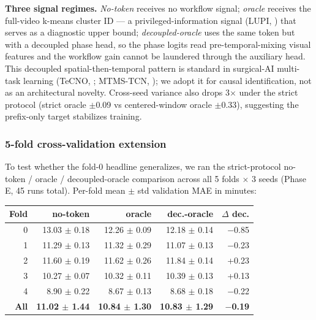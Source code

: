 \textbf{Three signal regimes.} \emph{No-token} receives no workflow
signal; \emph{oracle} receives the full-video k-means cluster ID — a
privileged-information signal (LUPI, \citealt{vapnik2009lupi}) that
serves as a diagnostic upper bound; \emph{decoupled-oracle} uses the
same token but with a decoupled phase head, so the phase logits read
pre-temporal-mixing visual features and the workflow gain cannot be
laundered through the auxiliary head. This decoupled spatial-then-temporal
pattern is standard in surgical-AI multi-task learning (TeCNO,
\citealt{czempiel2020tecno}; MTMS-TCN, \citealt{ramesh2021mtmstcn}); we
adopt it for causal identification, not as an architectural novelty.
Cross-seed variance also drops 3$\times$ under the strict protocol
(strict oracle $\pm$0.09 vs centered-window oracle $\pm$0.33), suggesting
the prefix-only target stabilizes training.

\subsubsection{5-fold cross-validation extension}\label{fold-cross-validation-extension}

To test whether the fold-0 headline generalizes, we ran the
strict-protocol no-token / oracle / decoupled-oracle comparison across
all 5 folds $\times$ 3 seeds (Phase E, 45 runs total). Per-fold mean $\pm$ std
validation MAE in minutes:

\begingroup
\scriptsize
\setlength{\tabcolsep}{3pt}
\renewcommand{\arraystretch}{0.88}
\par\noindent\centering
\begin{tabular}{@{}rrrrr@{}}
\toprule
Fold & no-token & oracle & dec.-oracle & $\Delta$ dec. \\
\midrule
0 & 13.03 $\pm$ 0.18 & 12.26 $\pm$ 0.09 & 12.18 $\pm$ 0.14 & $-$0.85 \\
1 & 11.29 $\pm$ 0.13 & 11.32 $\pm$ 0.29 & 11.07 $\pm$ 0.13 & $-$0.23 \\
2 & 11.60 $\pm$ 0.19 & 11.62 $\pm$ 0.26 & 11.84 $\pm$ 0.14 & +0.23 \\
3 & 10.27 $\pm$ 0.07 & 10.32 $\pm$ 0.11 & 10.39 $\pm$ 0.13 & +0.13 \\
4 & 8.90 $\pm$ 0.22 & 8.67 $\pm$ 0.13 & 8.68 $\pm$ 0.18 & $-$0.22 \\
\textbf{All} & \textbf{11.02 $\pm$ 1.44} & \textbf{10.84 $\pm$ 1.30} &
\textbf{10.83 $\pm$ 1.29} & \textbf{$-$0.19} \\
\bottomrule
\end{tabular}\par
\endgroup

